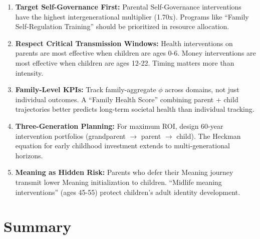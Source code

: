\begin{tcolorbox}[colback=green!5!white, colframe=green!75!black,
    title=Practical Implications]
\begin{enumerate}
\item \textbf{Target Self-Governance First:} Parental Self-Governance interventions have the highest
intergenerational multiplier (1.70x). Programs like ``Family Self-Regulation Training'' should
be prioritized in resource allocation.

\item \textbf{Respect Critical Transmission Windows:} Health interventions on parents are most
effective when children are ages 0-6. Money interventions are most effective when children
are ages 12-22. Timing matters more than intensity.

\item \textbf{Family-Level KPIs:} Track family-aggregate $\phi$ across domains, not just individual
outcomes. A ``Family Health Score'' combining parent + child trajectories better predicts
long-term societal health than individual tracking.

\item \textbf{Three-Generation Planning:} For maximum ROI, design 60-year intervention portfolios
(grandparent $\rightarrow$ parent $\rightarrow$ child). The Heckman equation for early childhood
investment extends to multi-generational horizons.

\item \textbf{Meaning as Hidden Risk:} Parents who defer their Meaning journey transmit lower
Meaning initialization to children. ``Midlife meaning interventions'' (ages 45-55) protect
children's adult identity development.
\end{enumerate}
\end{tcolorbox}



\section{Summary}
\label{sec:BI-summary}

